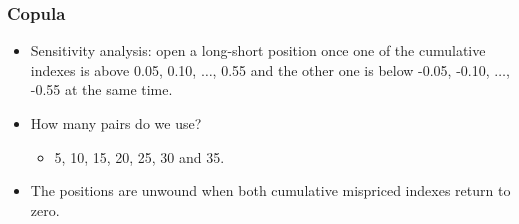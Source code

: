 \documentclass[pdf,10pt,xcolor=dvipsnames,hide notes]{beamer}
\begin{document}
\begin{frame}[label=frame4f3]
	\frametitle{Copula}
	
	
	\vspace{0.3cm}
	
	\begin{itemize}
		
		\item Sensitivity analysis: open a long-short position once one of the
		cumulative indexes is above 0.05, 0.10, $\ldots$, 0.55 and the other one is below
		-0.05, -0.10, $\ldots$, -0.55 at the same time.
		
		\vspace{0.3cm}
		
		\item How many pairs do we use?
		\begin{itemize}
			\item 5, 10, 15, 20, 25, 30 and 35.
		\end{itemize}
		
		
		\vspace{0.3cm}
		\pause
		
		\item The
		positions are unwound when both cumulative mispriced indexes return to zero.

	\end{itemize}
\end{frame}
	
\end{document}
